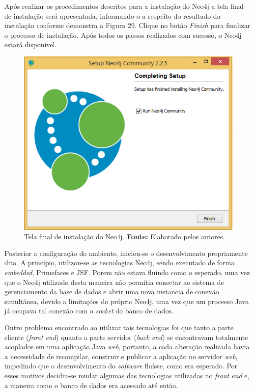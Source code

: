 \par Após realizar os procedimentos descritos para a instalação do Neo4j a tela final de instalação será apresentada, informando-o a respeito do resultado da instalação conforme demonstra a Figura 29. Clique no botão \textit{Finish} para finalizar o processo de instalação.
Após todos os passos realizados com sucesso, o Neo4j estará disponível.

\begin{figure}[h!]
	\centerline{\includegraphics[scale=0.4]{./imagens/neo4j-install-step5.png}}
	\caption[Tela final de instalação do Neo4j]
	{Tela final de instalação do Neo4j. \textbf{Fonte:} Elaborado pelos autores.}
	\label{fig:exemplo1}
\end{figure}
 


\par Posterior a configuração do ambiente, iniciou-se o desenvolvimento propriamente dito. A princípio, utilizou-se as tecnologias Neo4j, sendo executado de forma \textit{embedded}, Primefaces e JSF. Porem não estava fluindo como o esperado, uma vez que o Neo4j utilizado desta maneira não permitia conectar ao sistema de gerenciamento da base de dados e abrir uma nova instancia de conexão simultânea, devido a limitações do próprio Neo4j, uma vez que um processo Java já ocupava tal conexão com o \textit{socket} do banco de dados.

\par Outro problema encontrado ao utilizar tais tecnologias foi que tanto a parte cliente (\textit{front end}) quanto a parte servidor (\textit{back end}) se encontravam totalmente acoplados em uma aplicação Java \textit{web}, portanto, a cada alteração realizada havia a necessidade de recompilar, construir e publicar a aplicação no servidor \textit{web}, impedindo que o desenvolvimento do \textit{software} fluísse, como era esperado. Por esses motivos decidiu-se mudar algumas das tecnologias utilizadas no \textit{front end} e, a maneira como o banco de dados era acessado até então. 

